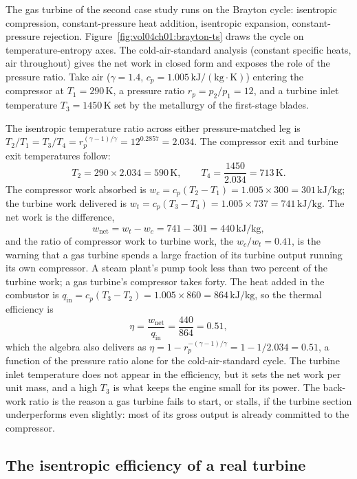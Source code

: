 The gas turbine of the second case study runs on the Brayton cycle:
isentropic compression, constant-pressure heat addition, isentropic
expansion, constant-pressure rejection.
Figure~\ref{fig:vol04ch01:brayton-ts} draws the cycle on
temperature-entropy axes. The cold-air-standard analysis (constant
specific heats, air throughout) gives the net work in closed form and
exposes the role of the pressure ratio. Take air ($\gamma = 1.4$,
$c_p = 1.005\,\text{kJ}/(\text{kg}\cdot\si{\kelvin})$) entering the
compressor at $T_1 = 290\,\si{\kelvin}$, a pressure ratio
$r_p = p_2/p_1 = 12$, and a turbine inlet temperature $T_3 =
1450\,\si{\kelvin}$ set by the metallurgy of the first-stage blades.

The isentropic temperature ratio across either pressure-matched leg is
$T_2/T_1 = T_3/T_4 = r_p^{(\gamma-1)/\gamma} = 12^{0.2857} = 2.034$. The
compressor exit and turbine exit temperatures follow:
\[
T_2 = 290 \times 2.034 = 590\,\si{\kelvin}, \qquad
T_4 = \frac{1450}{2.034} = 713\,\si{\kelvin}.
\]
The compressor work absorbed is $w_c = c_p (T_2 - T_1) = 1.005 \times
300 = 301\,\text{kJ}/\text{kg}$; the turbine work delivered is $w_t =
c_p (T_3 - T_4) = 1.005 \times 737 = 741\,\text{kJ}/\text{kg}$. The net
work is the difference,
\[
w_{\text{net}} = w_t - w_c = 741 - 301 = 440\,\text{kJ}/\text{kg},
\]
and the ratio of compressor work to turbine work, the
 $w_c/w_t = 0.41$, is the warning that a gas
turbine spends a large fraction of its turbine output running its own
compressor. A steam plant's pump took less than two percent of the
turbine work; a gas turbine's compressor takes forty. The heat added in
the combustor is $q_{\text{in}} = c_p (T_3 - T_2) = 1.005 \times 860 =
864\,\text{kJ}/\text{kg}$, so the thermal efficiency is
\[
\eta = \frac{w_{\text{net}}}{q_{\text{in}}} = \frac{440}{864} = 0.51,
\]
which the algebra also delivers as $\eta = 1 - r_p^{-(\gamma-1)/\gamma} =
1 - 1/2.034 = 0.51$, a function of the pressure ratio alone for the
cold-air-standard cycle. The turbine inlet temperature does not appear
in the efficiency, but it sets the net work per unit mass, and a high
$T_3$ is what keeps the engine small for its power. The back-work ratio
is the reason a gas turbine fails to start, or stalls, if the turbine
section underperforms even slightly: most of its gross output is already
committed to the compressor.



\subsection{The isentropic efficiency of a real turbine}

